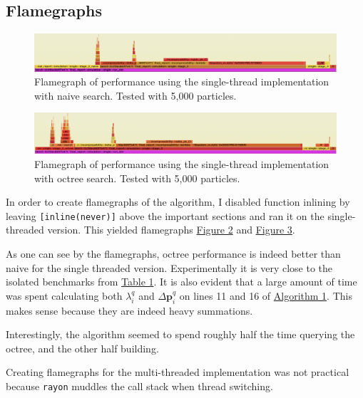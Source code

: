 \documentclass[sigplan,screen]{acmart}
\begin{document}
\subsection{Flamegraphs}

\begin{figure}[H]
  \includegraphics[width=\columnwidth]{images/single_naive_flamegraph.png}
  \caption{Flamegraph of performance using the single-thread implementation with naive search. Tested with 5,000 particles.}
  \label{fig:single_naive_flamegraph}
\end{figure}

\begin{figure}[H]
  \includegraphics[width=\columnwidth]{images/single_octree_flamegraph.png}
  \caption{Flamegraph of performance using the single-thread implementation with octree search. Tested with 5,000 particles.}
  \label{fig:single_octree_flamegraph}
\end{figure}

In order to create flamegraphs of the algorithm, I disabled function inlining by leaving \texttt{[inline(never)]} above the important sections and ran it on the single-threaded version. This yielded flamegraphs \hyperref[fig:single_naive_flamegraph]{Figure 2} and \hyperref[fig:single_octree_flamegraph]{Figure 3}.

As one can see by the flamegraphs, octree performance is indeed better than naive for the single threaded version. Experimentally it is very close to the isolated benchmarks from \hyperref[tab:runtimes]{Table 1}. It is also evident that a large amount of time was spent calculating both $\lambda_i^q$ and $\Delta \mathbf{p}_i^q$ on lines 11 and 16 of \hyperref[alg:cpu]{Algorithm 1}. This makes sense because they are indeed heavy summations.

Interestingly, the algorithm seemed to spend roughly half the time querying the octree, and the other half building.

Creating flamegraphs for the multi-threaded implementation was not practical because \texttt{rayon} muddles the call stack when thread switching.
\end{document}
